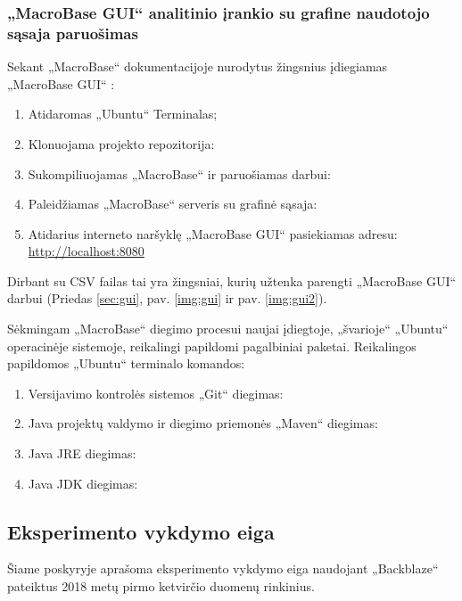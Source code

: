 \documentclass{VUMIFPSkursinis}
\begin{document}
\subsubsection{„MacroBase GUI“ analitinio įrankio su grafine naudotojo sąsaja paruošimas} \label{subsubsec:macrogui}
Sekant „MacroBase“ dokumentacijoje nurodytus žingsnius įdiegiamas „MacroBase GUI“ \cite{macrobase_doc}:
\begin{enumerate}
\item Atidaromas „Ubuntu“ Terminalas;
\item Klonuojama projekto repozitorija:\\
\item Sukompiliuojamas „MacroBase“ ir paruošiamas darbui:\\
\item Paleidžiamas „MacroBase“ serveris su grafinė sąsaja:\\
\item Atidarius interneto naršyklę „MacroBase GUI“ pasiekiamas adresu: \\\url{http://localhost:8080}
\end{enumerate}
Dirbant su CSV failas tai yra žingsniai, kurių užtenka parengti „MacroBase GUI“ darbui (Priedas \ref{sec:gui}, pav. \ref{img:gui} ir pav. \ref{img:gui2}).

Sėkmingam „MacroBase“ diegimo procesui naujai įdiegtoje, „švarioje“ „Ubuntu“ operacinėje sistemoje, reikalingi papildomi pagalbiniai paketai. Reikalingos papildomos „Ubuntu“ terminalo komandos:
\begin{enumerate}
\item Versijavimo kontrolės sistemos „Git“ \cite{git} diegimas:\\
\item Java projektų valdymo ir diegimo priemonės „Maven“ \cite{maven} diegimas:\\
\item Java JRE \cite{jre_jdk} diegimas:\\
\item Java JDK \cite{jre_jdk} diegimas:\\
\end{enumerate}

\subsection{Eksperimento vykdymo eiga} \label{subsec:exp}
Šiame poskyryje aprašoma eksperimento vykdymo eiga naudojant „Backblaze“ pateiktus 2018 metų pirmo ketvirčio duomenų rinkinius. 
\end{document}
